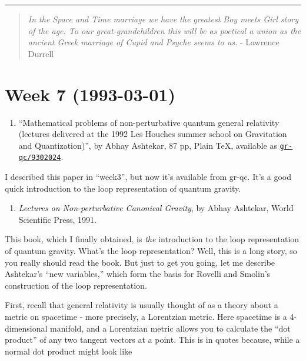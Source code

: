 \documentclass{article}
\def\tightlist{}
\begin{document}
\begin{center}\rule{0.5\linewidth}{0.5pt}\end{center}

\begin{quote}
\emph{In the Space and Time marriage we have the greatest Boy meets Girl
story of the age. To our great-grandchildren this will be as poetical a
union as the ancient Greek marriage of Cupid and Psyche seems to us.} -
Lawrence Durrell
\end{quote}
\hypertarget{week-7-1993-03-01}{%
\section{Week 7 (1993-03-01)}\label{week-7-1993-03-01}}

\begin{enumerate}
\def\labelenumi{\arabic{enumi})}
\tightlist
\item
  ``Mathematical problems of non-perturbative quantum general relativity
  (lectures delivered at the 1992 Les Houches summer school on
  Gravitation and Quantization)'', by Abhay Ashtekar, 87 pp, Plain TeX,
  available as
  \href{http://xxx.lanl.gov/abs/gr-qc/9302024}{\texttt{gr-qc/9302024}}.
\end{enumerate}

I described this paper in ``week3'', but now it's available from gr-qc.
It's a good quick introduction to the loop representation of quantum
gravity.

\begin{enumerate}
\def\labelenumi{\arabic{enumi})}
\setcounter{enumi}{1}
\tightlist
\item
  \emph{Lectures on Non-perturbative Canonical Gravity}, by Abhay
  Ashtekar, World Scientific Press, 1991.
\end{enumerate}

This book, which I finally obtained, is \emph{the} introduction to the
loop representation of quantum gravity. What's the loop representation?
Well, this is a long story, so you really should read the book. But just
to get you going, let me describe Ashtekar's ``new variables,'' which
form the basis for Rovelli and Smolin's construction of the loop
representation.

First, recall that general relativity is usually thought of as a theory
about a metric on spacetime - more precisely, a Lorentzian metric. Here
spacetime is a 4-dimensional manifold, and a Lorentzian metric allows
you to calculate the ``dot product'' of any two tangent vectors at a
point. This is in quotes because, while a normal dot product might look
like
\end{document}
